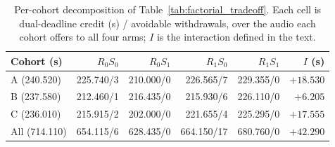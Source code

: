 \begin{table}[t]
\centering
\caption{Per-cohort decomposition of Table~\ref{tab:factorial_tradeoff}.
Each cell is dual-deadline credit (s) / avoidable withdrawals, over the
audio each cohort offers to all four arms; $I$ is the interaction
defined in the text.}
\label{tab:cohort_factorial}
\begingroup\footnotesize\setlength{\tabcolsep}{3.2pt}
\begin{tabular}{@{}lrrrrr@{}}
\toprule
Cohort (s) & $R_0S_0$ & $R_0S_1$ & $R_1S_0$ & $R_1S_1$ & $I$ (s)\\
\midrule
A (240.520) & 225.740/3 & 210.000/0 & 226.565/7 & 229.355/0 & $+18.530$\\
B (237.580) & 212.460/1 & 216.435/0 & 215.930/6 & 226.110/0 & $+6.205$\\
C (236.010) & 215.915/2 & 202.000/0 & 221.655/4 & 225.295/0 & $+17.555$\\
\midrule
All (714.110) & 654.115/6 & 628.435/0 & 664.150/17 & 680.760/0 & $+42.290$\\
\bottomrule
\end{tabular}\endgroup
\end{table}
